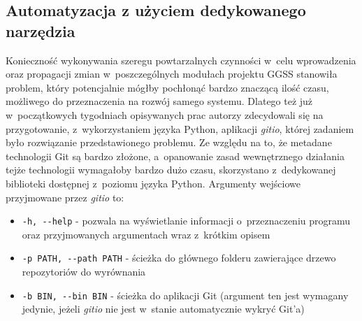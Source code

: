 \subsection{Automatyzacja z użyciem dedykowanego narzędzia}
\label{subsec:gitio}
Konieczność wykonywania szeregu powtarzalnych czynności w~celu wprowadzenia oraz propagacji zmian w~poszczególnych modułach projektu GGSS stanowiła problem, który potencjalnie mógłby pochłonąć bardzo znaczącą ilość czasu, możliwego do przeznaczenia na rozwój samego systemu. Dlatego też już w~początkowych tygodniach opisywanych prac autorzy zdecydowali się na przygotowanie, z~wykorzystaniem języka Python, aplikacji \emph{gitio}, której zadaniem było rozwiązanie przedstawionego problemu. Ze względu na to, że metadane technologii Git są bardzo złożone, a~opanowanie zasad wewnętrznego działania tejże technologii wymagałoby bardzo dużo czasu, skorzystano z~dedykowanej biblioteki \cite{gitpython} dostępnej z~poziomu języka Python. Argumenty wejściowe przyjmowane przez \emph{gitio} to:
\begin{itemize}
    \item \lstinline{-h, --help} - pozwala na wyświetlanie informacji o~przeznaczeniu programu oraz przyjmowanych argumentach wraz z~krótkim opisem
    \item \lstinline{-p PATH, --path PATH} - ścieżka do głównego folderu zawierające drzewo repozytoriów do wyrównania
    \item \lstinline{-b BIN, --bin BIN} - ścieżka do aplikacji Git (argument ten jest wymagany jedynie, jeżeli \emph{gitio} nie jest w~stanie automatycznie wykryć Git'a)
\end{itemize}

